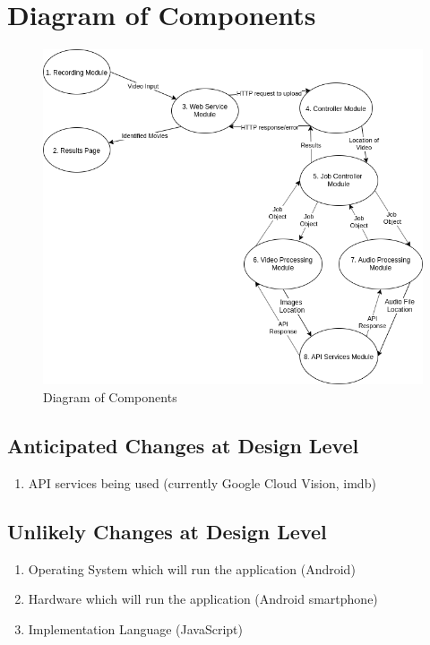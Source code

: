 \documentclass{article}
\begin{document}
\section{Diagram of Components}

\begin{figure}[H]
    \centering
    \includegraphics[width = \textwidth]{img/SystemDesign/ComponentDiagram.png}
    \caption{Diagram of Components}
    \label{fig:Component}
\end{figure}

\subsection{Anticipated Changes at Design Level}
\begin{enumerate}
    \item API services being used (currently Google Cloud Vision, imdb)
\end{enumerate}

\subsection{Unlikely Changes at Design Level}
\begin{enumerate}
    \item Operating System which will run the application (Android)
    \item Hardware which will run the application (Android smartphone)
    \item Implementation Language (JavaScript)
\end{enumerate}
\end{document}
